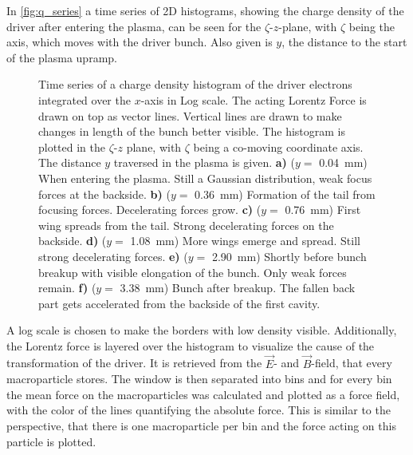 \documentclass[bachelor_thesis]{subfiles}
\begin{document}
In \autoref{fig:q_series} a time series of 2D histograms, showing the charge density of the driver after entering the plasma, can be seen for the $\zeta$-$z$-plane, with $\zeta$ being the axis, which moves with the driver bunch. Also given is $y$, the distance to the start of the plasma upramp.
\begin{figure}
	\centering
	
	\caption{Time series of a charge density histogram of the driver electrons integrated over the $x$-axis in Log scale. The acting Lorentz Force is drawn on top as vector lines. Vertical lines are drawn to make changes in length of the bunch better visible. 
	The histogram is plotted in the $\zeta$-$z$ plane, with $\zeta$ being a co-moving coordinate axis. The distance $y$ traversed in the plasma is given.
	\textbf{a)} ($y=$ \qty{0.04}{mm}) When entering the plasma. Still a Gaussian distribution, weak focus forces at the backside.
	\textbf{b)} ($y=$ \qty{0.36}{mm}) Formation of the tail from focusing forces. Decelerating forces grow.
	\textbf{c)} ($y=$ \qty{0.76}{mm}) First wing spreads from the tail. Strong decelerating forces on the backside.
	\textbf{d)} ($y=$ \qty{1.08}{mm}) More wings emerge and spread. Still strong decelerating forces.
	\textbf{e)} ($y=$ \qty{2.90}{mm}) Shortly before bunch breakup with visible elongation of the bunch. Only weak forces remain.
	\textbf{f)} ($y=$ \qty{3.38}{mm}) Bunch after breakup. The fallen back part gets accelerated from the backside of the first cavity.}
	\label{fig:q_series}
\end{figure}

A log scale is chosen to make the borders with low density visible. Additionally, the Lorentz force is layered over the histogram to visualize the cause of the transformation of the driver. It is retrieved from the $\vec{E}$- and $\vec{B}$-field, that every macroparticle stores.
The window is then separated into bins and for every bin the mean force on the macroparticles was calculated and plotted as a force field, with the color of the lines quantifying the absolute force. 
This is similar to the perspective, that there is one macroparticle per bin and the force acting on this particle is plotted.
\end{document}
